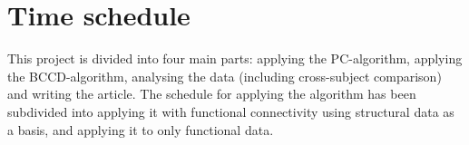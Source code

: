 \documentclass[a4paper, 10pt, english, twocolumn]{article}
\begin{document}

\section{Time schedule}
This project is divided into four main parts: applying the PC-algorithm, applying the BCCD-algorithm, analysing the data (including cross-subject comparison) and writing the article. The schedule for applying the algorithm has been subdivided into applying it with functional connectivity using structural data as a basis, and applying it to only functional data.



{}

\end{document}
